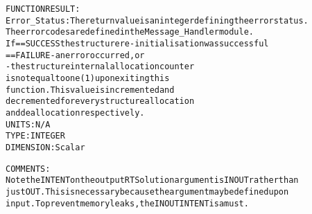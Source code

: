 \begin{alltt}
  FUNCTION RESULT:
        Error_Status: The return value is an integer defining the error status.
                      The error codes are defined in the Message_Handler module.
                      If == SUCCESS the structure re-initialisation was successful
                         == FAILURE - an error occurred, or
                                    - the structure internal allocation counter
                                      is not equal to one (1) upon exiting this
                                      function. This value is incremented and
                                      decremented for every structure allocation
                                      and deallocation respectively.
                      UNITS:      N/A
                      TYPE:       INTEGER
                      DIMENSION:  Scalar
 
  COMMENTS:
        Note the INTENT on the output RTSolution argument is IN OUT rather than
        just OUT. This is necessary because the argument may be defined upon
        input. To prevent memory leaks, the IN OUT INTENT is a must.
 
  \end{alltt}
